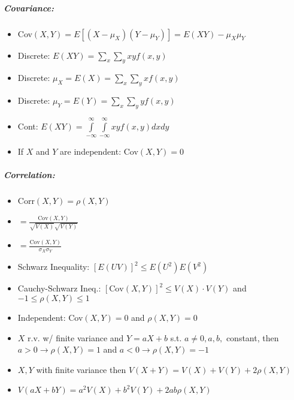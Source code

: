 \documentclass[landscape,10pt]{article}
\begin{document}
\begin{multicols}{4}
\subparagraph*{Covariance: }
\begin{itemize}
    \item[] Cov\((X,Y) = E[(X-\mu_X)(Y-\mu_Y)] = E(XY) - \mu_X\mu_Y\)
    \item[] Discrete: \(E(XY) = \sum\limits_x\sum\limits_yxyf(x,y)\)
    \item[] Discrete: \(\mu_X = E(X) = \sum\limits_x\sum\limits_yxf(x,y)\)
    \item[] Discrete: \(\mu_Y = E(Y) = \sum\limits_x\sum\limits_yyf(x,y)\)
    \item[] Cont: \(E(XY) = \int\limits_{-\infty}^{\infty}\int\limits_{-\infty}^{\infty}{xyf(x,y)dxdy}\)
    \item[] If \(X\) and \(Y\) are independent: Cov\((X,Y) = 0\)
\end{itemize}
\subparagraph*{Correlation: }
\begin{itemize}
    \item[] Corr\((X,Y) = \rho(X,Y)\)
    \item[] \(= \frac{\text{Cov}(X,Y)}{\sqrt{V(X)}\sqrt{V(Y)}}\)
    \item[] \(=\frac{\text{Cov}(X,Y)}{\sigma_X \sigma_Y}\)
    \item[] Schwarz Inequality: \([E(UV)]^2 \leq E(U^2)E(V^2)\)
    \item[] Cauchy-Schwarz Ineq.: \([\text{Cov}(X,Y)]^2 \leq V(X) \cdot V(Y)\) and \( -1 \leq \rho(X,Y) \leq 1\)
    \item[] Independent: Cov\((X,Y) = 0\) and \(\rho(X,Y) = 0\)
    \item[] \(X\) r.v. w/ finite variance and \(Y = aX+b\) s.t. \(a \neq 0, a,b,\) constant, then \(a > 0 \rightarrow \rho(X,Y) = 1\) and \(a < 0 \rightarrow \rho(X,Y) = -1\)
    \item[] \(X,Y\) with finite variance then \(V(X+Y) = V(X)+V(Y) + 2\rho(X,Y)\)
    \item[] \(V(aX + bY) = a^2 V(X) + b^2 V(Y) + 2ab\rho(X,Y)\)
\end{itemize}



\end{multicols}
\end{document}
